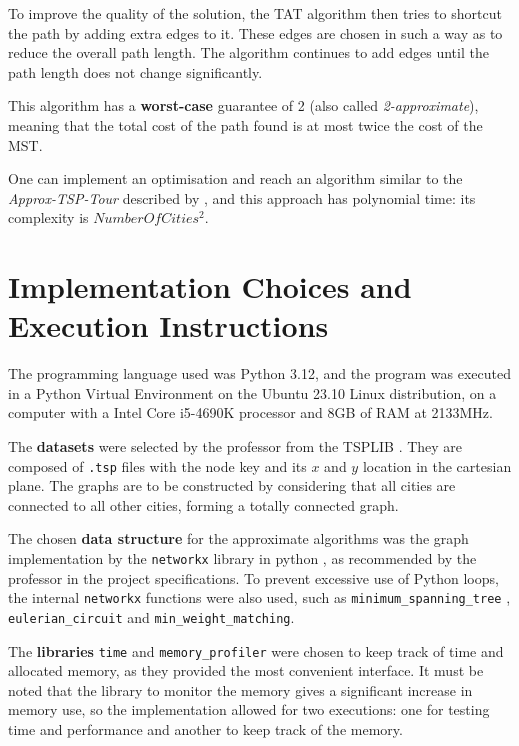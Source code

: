\documentclass[12pt]{article}
\begin{document}
To improve the quality of the solution, the TAT algorithm then tries to shortcut the 
path by adding extra edges to it. These edges are chosen in such a way as to reduce 
the overall path length. The algorithm continues to add edges until the path length 
does not change significantly.

This algorithm has a \textbf{worst-case} guarantee of 2 (also called \textit{2-approximate}), meaning 
that the total cost of the path found is at most twice the cost of the MST.

One can implement an optimisation and reach an algorithm similar to the \textit{Approx-TSP-Tour} 
described by \cite{cormen}, and this approach has polynomial time: its complexity is $NumberOfCities^2$.


\section{Implementation Choices and Execution Instructions} \label{sec:implementation}

The programming language used was Python 3.12, and the program was executed 
in a Python Virtual Environment on the Ubuntu 23.10 Linux distribution, on a computer with a 
Intel Core i5-4690K processor and 8GB of RAM at 2133MHz.

The \textbf{datasets} were selected by the professor from the TSPLIB \cite{dataset_lib}. They are 
composed of \texttt{.tsp} files with the node key and its $x$ and $y$ location in the cartesian plane. 
The graphs are to be constructed by considering that all cities are connected to all other cities, forming 
a totally connected graph.

The chosen \textbf{data structure} for the approximate algorithms was the graph implementation 
by the \texttt{networkx} library in python \cite{networkx_docs}, as recommended by 
the professor in the project specifications. To prevent excessive use of Python loops, 
the internal \texttt{networkx} functions were also used, such as \texttt{minimum\_spanning\_tree} , 
\texttt{eulerian\_circuit} and \texttt{min\_weight\_matching}.

The \textbf{libraries} \texttt{time} and \texttt{memory\_profiler} were chosen to keep track of time 
and allocated memory, as they provided the most convenient interface. It must be noted that the library 
to monitor the memory gives a significant increase in memory use, so the implementation allowed for 
two executions: one for testing time and performance and another to keep track of the memory.
\end{document}
